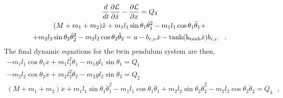 \begin{gather}
\frac{d}{dt}  \frac{\partial \cal{L}}{\partial \dot{x}} - \frac{\partial \cal{L}}{\partial x}  = Q_3 \\
(M + m_1 + m_2) \ddot{x} + m_1 l_1 \sin \theta_1 \dot{\theta}_1^2 - m_1 l_1 \cos \theta_1 \ddot{\theta}_1 + \nonumber \\
+ m_2 l_2 \sin \theta_2 \dot{\theta}_2^2 - m_2 l_2 \cos \theta_2 \ddot{\theta}_2 = u - b_{c,v} \dot{x} - \tanh(\text{k}_\text{tanh}\dot{x}) b_{c,c}  \ \ \ .
\label{eq:xDynamics}
\end{gather}
%
The final dynamic equations for the twin pendulum system are then,
%
\begingroup\makeatletter\def\f@size{10}\check@mathfonts
\def\maketag@@@#1{\hbox{\m@th\normalsize\normalfont#1}}%
\begin{gather}
- m_1 l_1 \cos \theta_1 \ddot{x} + m_1 l_1^2 \ddot{\theta}_1 - m_1 g l_1 \sin \theta_1 = Q_1 
\label{eq:theta1Dynamics1} \\
- m_2 l_2 \cos \theta_2 \ddot{x} + m_2 l_2^2 \ddot{\theta}_2 - m_2 g l_2 \sin \theta_2 = Q_2
\label{eq:theta2Dynamics1} \\
(M + m_1 + m_2) \ddot{x} + m_1 l_1 \sin \theta_1 \dot{\theta}_1^2 - m_1 l_1 \cos \theta_1 \ddot{\theta}_1 + m_2 l_2 \sin \theta_2 \dot{\theta}_2^2 - m_2 l_2 \cos \theta_2 \ddot{\theta}_2 = Q_3  \ \ \ , 
\label{eq:xDynamics1} \\ \nonumber
\end{gather}\endgroup \vspace{-44pt}

